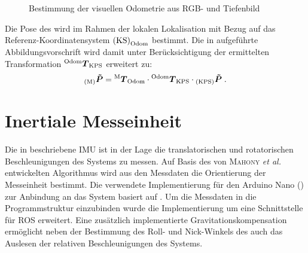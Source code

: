 \begin{figure}[!ht]
	\begin{center}
	\hspace{5mm}
	\caption{Bestimmung der visuellen Odometrie aus RGB- und Tiefenbild}
	\label{fig.fovis}
	\end{center}
\end{figure}

Die Pose des  wird im Rahmen der lokalen Lokalisation mit Bezug auf das Referenz-Koordinatensystem ${\mathrm{(KS)}}_{\mathrm{Odom}}$ bestimmt. Die in  aufgeführte Abbildungsvorschrift wird damit unter Berücksichtigung der ermittelten Transformation ${^{\mathrm{Odom}}\mbox{\boldmath{$T$}}_{\mathrm{KPS}}}$ erweitert zu:
%
\begin{equation}
{_{{\mathrm{(M)}}}}\mbox{\boldmath{$\tilde{P}$}} = {^{\mathrm{M}}\mbox{\boldmath{$T$}}_{\mathrm{Odom}}} \cdot {^{\mathrm{Odom}}\mbox{\boldmath{$T$}}_{\mathrm{KPS}}} \cdot {_{{\mathrm{(KPS)}}}}\mbox{\boldmath{$\tilde{P}$}} \; \text{.}
\label{eq.locloc}
\end{equation}

\prever{
}
\prever{
}
\section{Inertiale Messeinheit}
Die in  beschriebene IMU ist in der Lage die translatorischen und rotatorischen Beschleunigungen des Systems zu messen. Auf Basis des von \textsc{Mahony} \textit{et al.} \cite{Mahony2008} entwickelten Algorithmus wird aus den Messdaten die Orientierung der Messeinheit bestimmt. Die verwendete Implementierung für den Arduino Nano () zur Anbindung an das System basiert auf \cite{IMUCode}. Um die Messdaten in die Programmstruktur einzubinden wurde die Implementierung um eine Schnittstelle für ROS erweitert. Eine zusätzlich implementierte Gravitationskompensation ermöglicht neben der Bestimmung des Roll- und Nick-Winkels des  auch das Auslesen der relativen Beschleunigungen des Systems.\\

